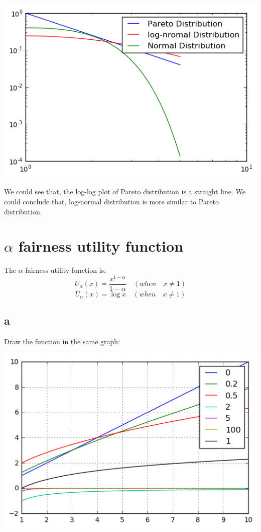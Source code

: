 \documentclass[12pt,a4paper]{article}
\begin{document}
\includegraphics{PIC/distribution-log.png}

We could see that, the log-log plot of Pareto distribution is a straight line.
We could conclude that, log-normal distribution is more similar to Pareto distribution.

\section{$\alpha$ fairness utility function}

The $\alpha$ fairness utility function is:
\begin{equation}
U_{\alpha}(x) = \frac{x^{1-\alpha}}{1-\alpha} \quad (when \quad x \neq 1)
\end{equation}
\begin{equation}
U_{\alpha}(x) = \log{x} \quad (when \quad x \neq 1)
\end{equation}
\subsection{a}
Draw the function in the same graph:

\includegraphics{PIC/fairness.png}
\end{document}
